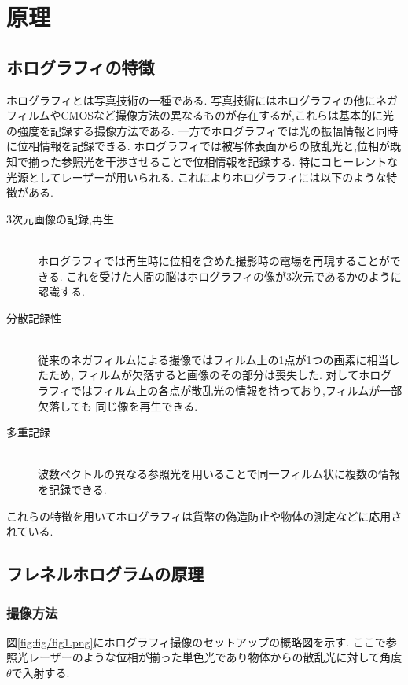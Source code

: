 \section{原理}
\subsection{ホログラフィの特徴}
ホログラフィとは写真技術の一種である.
写真技術にはホログラフィの他にネガフィルムやCMOSなど撮像方法の異なるものが存在するが,これらは基本的に光の強度を記録する撮像方法である.
一方でホログラフィでは光の振幅情報と同時に位相情報を記録できる.
ホログラフィでは被写体表面からの散乱光と,位相が既知で揃った参照光を干渉させることで位相情報を記録する.
特にコヒーレントな光源としてレーザーが用いられる.
これによりホログラフィには以下のような特徴がある.
\begin{description}
  \item [3次元画像の記録,再生] \text{ }\\
  ホログラフィでは再生時に位相を含めた撮影時の電場を再現することができる.
  これを受けた人間の脳はホログラフィの像が3次元であるかのように認識する.
  \item [分散記録性] \text{ }\\
  従来のネガフィルムによる撮像ではフィルム上の1点が1つの画素に相当したため,
  フィルムが欠落すると画像のその部分は喪失した.
  対してホログラフィではフィルム上の各点が散乱光の情報を持っており,フィルムが一部欠落しても
  同じ像を再生できる.
  \item [多重記録] \text{ }\\
  波数ベクトルの異なる参照光を用いることで同一フィルム状に複数の情報を記録できる.
\end{description}
これらの特徴を用いてホログラフィは貨幣の偽造防止や物体の測定などに応用されている.
\subsection{フレネルホログラムの原理}
\subsubsection{撮像方法}
図\ref{fig:fig/fig1.png}にホログラフィ撮像のセットアップの概略図を示す.
ここで参照光レーザーのような位相が揃った単色光であり物体からの散乱光に対して角度$\theta$で入射する.

